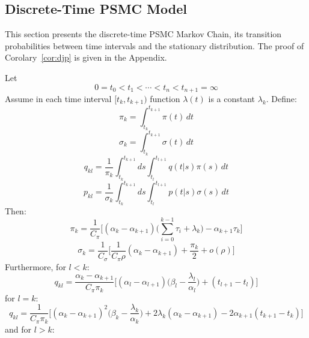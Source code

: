 \documentclass[pdftex,10pt]{article}
\begin{document}
\subsection{Discrete-Time PSMC Model}

This section presents the discrete-time PSMC Markov Chain, its transition probabilities
between time intervals and the stationary distribution. The proof of Corolary~\ref{cor:djp}
is given in the Appendix.

\begin{cor}\label{cor:djp}
  Let
  \[ 0=t_0<t_1<\cdots<t_n<t_{n+1}=\infty \]
  Assume in each time interval $[t_k,t_{k+1})$ function $\lambda(t)$ is a
  constant $\lambda_k$. Define:
  \begin{equation*}
    \pi_k=\int_{t_k}^{t_{k+1}}\pi(t)\,dt
  \end{equation*}
  \begin{equation*}
    \sigma_k=\int_{t_k}^{t_{k+1}}\sigma(t)\,dt
  \end{equation*}
  \begin{equation*}
    q_{kl}=\frac{1}{\pi_k}\int_{t_k}^{t_{k+1}}ds\int_{t_l}^{t_{l+1}}q(t|s)\pi(s)\,dt
  \end{equation*}
  \begin{equation*}
    p_{kl}=\frac{1}{\sigma_k}\int_{t_k}^{t_{k+1}}ds\int_{t_l}^{t_{l+1}}p(t|s)\sigma(s)\,dt
  \end{equation*}
  Then:
  \begin{equation*}
    \pi_k=\frac{1}{C_{\pi}}\Bigg[(\alpha_k-\alpha_{k+1})\Big(\sum_{i=0}^{k-1}\tau_i+\lambda_k\Big)
    -\alpha_{k+1}\tau_k\Bigg]
  \end{equation*}
  \begin{equation}\label{equ:sigmak}
    \sigma_k=\frac{1}{C_{\sigma}}
    \Bigg[\frac{1}{C_{\pi}\rho}(\alpha_k-\alpha_{k+1})+\frac{\pi_k}{2}+o(\rho)\Bigg]
  \end{equation}
  Furthermore, for $l<k$:
  \begin{equation*}
    q_{kl}=\frac{\alpha_k-\alpha_{k+1}}{C_{\pi}\pi_k}\Bigg[(\alpha_l-\alpha_{l+1})\Big(\beta_l-\frac{\lambda_l}{\alpha_l}\Big)
    +(t_{l+1}-t_l)\Bigg]
  \end{equation*}
  for $l=k$:
  \begin{equation*}
    q_{kl}=\frac{1}{C_{\pi}\pi_k}\Bigg[(\alpha_k-\alpha_{k+1})^2\Big(\beta_k-\frac{\lambda_k}{\alpha_k}\Big)
    +2\lambda_k(\alpha_k-\alpha_{k+1})-2\alpha_{k+1}(t_{k+1}-t_k)\Bigg]
  \end{equation*}
  and for $l>k$:
  \begin{equation*}

\end{equation*}
\end{cor}
\end{document}
